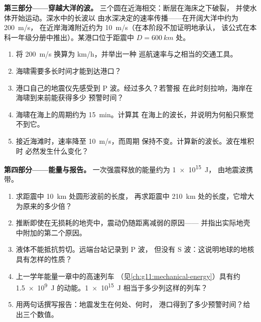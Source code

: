 \begin{problem}
\medskip
\noindent\textbf{第三部分——穿越大洋的波。}
三个圆在近海相交：断层在海床之下破裂，
并使水体开始运动。深水中的长波以
由水深决定的速率传播——在开阔大洋中约为 \qty{200}{m/s}，
在近岸海滩附近约为 \qty{10}{m/s}（在本阶段不加证明地承认，
该公式在本科一年级分册中推出）。某港口位于距震中
$D = \qty{600}{km}$ 处。
\begin{enumerate}[resume]
  \item 将 \qty{200}{m/s} 换算为 \unit{km/h}，并举出一种
        巡航速率与之相当的交通工具。
  \item 海啸需要多长时间才能到达港口？
  \item 港口自己的地震仪先感受到 P 波。经过多久？若警报
        在此时刻拉响，海岸在海啸到来前能获得多少
        预警时间？
  \item 海啸在海上的周期约为 \qty{15}{min}。计算其
        在海上的波长，并说明为何船只察觉不到它。
  \item 接近海滩时，速率降至 \qty{10}{m/s}，而周期
        保持不变。计算新的波长。波在堆积时
        必然发生什么变化？
\end{enumerate}

\medskip
\noindent\textbf{第四部分——能量与报告。}
一次强震释放的能量约为 \qty{1e15}{J}，
由地震波携带。
\begin{enumerate}[resume]
  \item 求距震中 \qty{10}{km} 处圆形波前的长度，
        再求距震中 \qty{210}{km} 处的长度，它增大为原来的多少倍？
  \item 推断即使在无损耗的地壳中，震动仍随距离减弱的原因——
        并指出实际地壳中附加的第二个原因。
  \item 液体不能抵抗剪切。远端台站记录到 P 波，
        但没有 S 波：这说明地球的地核具有怎样的性质？
  \item 上一学年能量一章中的高速列车
        （见\cref{ch:g11:mechanical-energy}）具有约 \qty{1.5e9}{J}
        的动能。\qty{1e15}{J} 相当于多少列这样的列车？
  \item 用两句话撰写报告：地震发生在何处、何时，
        港口得到了多少预警时间？给出三个数值。
\end{enumerate}
\end{problem}
